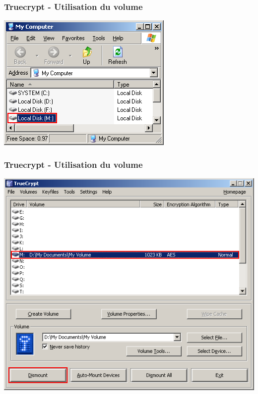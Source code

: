 \documentclass{beamer}
\begin{document}
\begin{frame}
\frametitle{Truecrypt - Utilisation du volume}
\begin{center}
\includegraphics[scale=0.5] {./images/Truecrypt20.png} 
\end{center}
\end{frame}
\begin{frame}
\frametitle{Truecrypt - Utilisation du volume}
\begin{center}
\includegraphics[scale=0.5] {./images/Truecrypt21.png} 
\end{center}
\end{frame}
\end{document}

